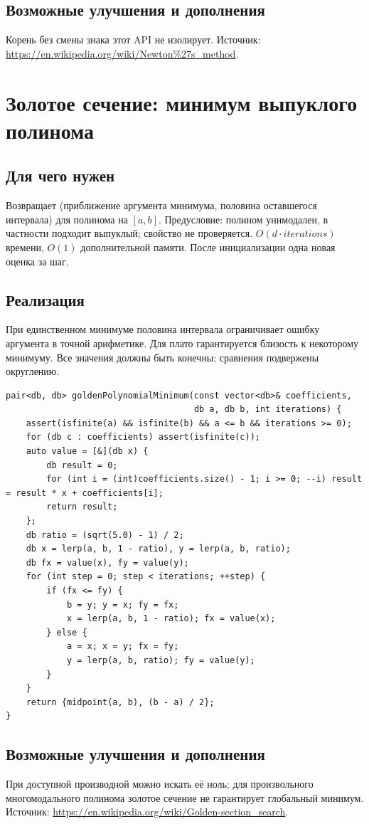 \subsection*{Возможные улучшения и дополнения}
Корень без смены знака этот API не изолирует.
Источник: \url{https://en.wikipedia.org/wiki/Newton%27s_method}.


\fi
\iffalse
\section{Золотое сечение: минимум выпуклого полинома}
\subsection*{Для чего нужен}
Возвращает (приближение аргумента минимума, половина оставшегося интервала)
для полинома на $[a,b]$. Предусловие: полином унимодален, в частности
подходит выпуклый; свойство не проверяется. $O(d\cdot iterations)$ времени,
$O(1)$ дополнительной памяти. После инициализации одна новая оценка за шаг.
\subsection*{Реализация}
При единственном минимуме половина интервала ограничивает ошибку аргумента
в точной арифметике. Для плато гарантируется близость к некоторому минимуму.
Все значения должны быть конечны; сравнения подвержены округлению.
\begin{lstlisting}[name=optimization_golden]
pair<db, db> goldenPolynomialMinimum(const vector<db>& coefficients,
                                     db a, db b, int iterations) {
    assert(isfinite(a) && isfinite(b) && a <= b && iterations >= 0);
    for (db c : coefficients) assert(isfinite(c));
    auto value = [&](db x) {
        db result = 0;
        for (int i = (int)coefficients.size() - 1; i >= 0; --i) result = result * x + coefficients[i];
        return result;
    };
    db ratio = (sqrt(5.0) - 1) / 2;
    db x = lerp(a, b, 1 - ratio), y = lerp(a, b, ratio);
    db fx = value(x), fy = value(y);
    for (int step = 0; step < iterations; ++step) {
        if (fx <= fy) {
            b = y; y = x; fy = fx;
            x = lerp(a, b, 1 - ratio); fx = value(x);
        } else {
            a = x; x = y; fx = fy;
            y = lerp(a, b, ratio); fy = value(y);
        }
    }
    return {midpoint(a, b), (b - a) / 2};
}
\end{lstlisting}
\subsection*{Возможные улучшения и дополнения}
При доступной производной можно искать её ноль; для произвольного
многомодального полинома золотое сечение не гарантирует глобальный минимум.
Источник: \url{https://en.wikipedia.org/wiki/Golden-section_search}.


